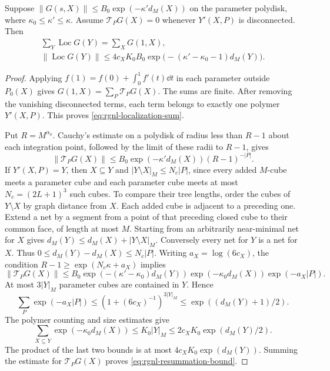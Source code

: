 \begin{lemma}\label{lem:rgnl-resummation}
Suppose
$\|G(s,X)\|\le B_0\exp(-\kappa'd_M(X))$ on the parameter
polydisk, where $\kappa_0\le\kappa'\le\kappa$.
Assume $\mathcal T_PG(X)=0$ whenever $Y'(X,P)$ is
disconnected. Then
\begin{gather}
 \sum_Y\operatorname{Loc}G(Y)=\sum_XG(1,X),
                         \label{eq:rgnl-localization-sum}\\
 \|\operatorname{Loc}G(Y)\|
   \le4c_XK_0B_0
             \exp\big(-(\kappa'-\kappa_0-1)d_M(Y)\big).
                         \label{eq:rgnl-resummation-bound}
\end{gather}
\end{lemma}

\begin{proof}
Applying $f(1)=f(0)+\int_0^1f'(t)\dd t$ in each parameter
outside $P_0(X)$ gives $G(1,X)=\sum_P\mathcal T_PG(X)$.
The sums are finite. After removing the vanishing disconnected
terms, each term belongs to exactly one polymer $Y'(X,P)$.
This proves \eqref{eq:rgnl-localization-sum}.

Put $R=M^{\alpha_0}$. Cauchy's estimate on a polydisk of
radius less than $R-1$ about each integration point, followed
by the limit of these radii to $R-1$, gives
\[
 \|\mathcal T_PG(X)\|
       \le B_0\exp(-\kappa'd_M(X))(R-1)^{-|P|}.
\]
If $Y'(X,P)=Y$, then $X\subseteq Y$ and
$|Y\setminus X|_M\le N_c|P|$, since every added $M$-cube
meets a parameter cube and each parameter cube meets at
most $N_c=(2L+1)^3$ such cubes.
To compare their tree lengths, order the cubes of $Y\setminus X$
by graph distance from $X$. Each added cube is adjacent
to a preceding one. Extend a net by a segment from
a point of that preceding closed cube to their common
face, of length at most $M$. Starting from an
arbitrarily near-minimal net for $X$ gives
$d_M(Y)\le d_M(X)+|Y\setminus X|_M$.
Conversely every net for $Y$ is a net for $X$.
Thus $0\le d_M(Y)-d_M(X)\le N_c|P|$.
Writing $a_X=\log(6c_X)$, the condition
$R-1\ge\exp(N_c\kappa+a_X)$ implies
\[
 \|\mathcal T_PG(X)\|
 \le B_0\exp(-(\kappa'-\kappa_0)d_M(Y))
             \exp(-\kappa_0d_M(X))\exp(-a_X|P|).
\]
At most $3|Y|_M$ parameter cubes are contained in $Y$.
Hence
\[
 \sum_P\exp(-a_X|P|)
       \le(1+(6c_X)^{-1})^{3|Y|_M}
       \le \exp((d_M(Y)+1)/2).
\]
The polymer counting and size estimates give
\[
 \sum_{X\subseteq Y}\exp(-\kappa_0d_M(X))
   \le K_0|Y|_M
   \le2c_XK_0\exp(d_M(Y)/2).
\]
The product of the last two bounds is at most
$4c_XK_0\exp(d_M(Y))$. Summing the estimate for
$\mathcal T_PG(X)$ proves
\eqref{eq:rgnl-resummation-bound}.
\end{proof}

